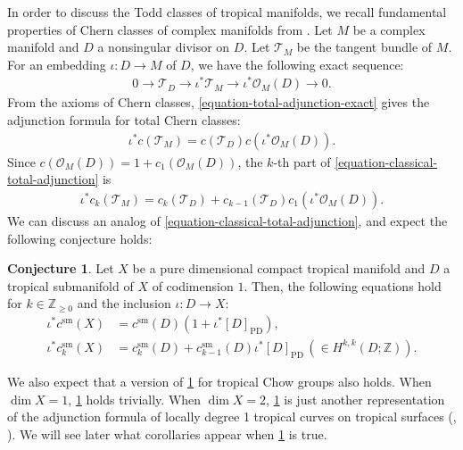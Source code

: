 \documentclass[a4paper,dvipdfmx,reqno,12pt]{amsart}
\theoremstyle{definition}
\newtheorem{conjecture}[theorem]{Conjecture}
\newcommand{\PD}[1]{[#1]_{\mathrm{PD}}}
\numberwithin{equation}{section}
\begin{document}
In order to discuss the Todd classes of
tropical manifolds, we recall fundamental properties
of Chern classes of complex manifolds from
\cite{MR1335917,MR1644323,MR2810322}.
Let $M$ be a complex manifold and 
$D$ a nonsingular
divisor on $D$. Let $\mathcal{T}_M$ be the tangent
bundle of $M$.
For an embedding $\iota\colon D\to M$ of
$D$, we have the following
exact sequence: 
\begin{align}
\label{equation-total-adjunction-exact}
0 \to \mathcal{T}_{D}\to \iota^{*}\mathcal{T}_M
\to \iota^{*}\mathcal{O}_M(D)\to 0.
\end{align}
From the axioms of Chern classes,
\eqref{equation-total-adjunction-exact} gives 
the adjunction formula for total Chern classes:
\begin{align}
\label{equation-classical-total-adjunction}
\iota^{*}c(\mathcal{T}_M)
=c(\mathcal{T}_{D})c(\iota^{*}\mathcal{O}_M(D)).
\end{align}
Since $c(\mathcal{O}_M(D))=1+c_1(\mathcal{O}_M(D))$, 
the $k$-th part of \eqref{equation-classical-total-adjunction}
is
\begin{align}
\label{equation-classical-total-adjunction-2}
\iota^{*}c_k(\mathcal{T}_M)
=c_{k}(\mathcal{T}_{D})+
c_{k-1}(\mathcal{T}_{D})c_1(\iota^{*}\mathcal{O}_M(D)).
\end{align}
We can discuss an analog of 
\eqref{equation-classical-total-adjunction},
and expect the following conjecture holds:
\begin{conjecture}
\label{conjecture-grr-divisor}
Let $X$ be a pure dimensional compact tropical manifold
and $D$ a tropical submanifold of $X$ of codimension $1$.
Then, the following equations hold for 
$k\in \mathbb{Z}_{\geq 0}$ and the inclusion 
$\iota\colon D \to X$:
\begin{align}
\label{equation-total-adjunction}
\iota^{*}c^{\mathrm{sm}}(X)&=c^{\mathrm{sm}}(D)
(1+\iota^{*}\PD{D}), \\ 
\iota^{*}c^{\mathrm{sm}}_k(X)&=c^{\mathrm{sm}}_k(D)+
c^{\mathrm{sm}}_{k-1}(D)\iota^{*}\PD{D} \,
(\in H^{k,k}(D;\mathbb{Z})).
\end{align}
\end{conjecture}
We also expect that a version
of \cref{conjecture-grr-divisor} for tropical
Chow groups \cite[Definition 3.30]{shaw2015tropical}
also holds.
When $\dim X=1$, \cref{conjecture-grr-divisor} holds
trivially. When $\dim X=2$,
\cref{conjecture-grr-divisor}
is just another representation of the adjunction formula
of locally degree 1 tropical curves on tropical surfaces
(\cite[Theorem 6]{shaw2015tropical},
\cite[Theorem 5.2]{demedrano2023chern}).
We will see later what 
corollaries appear
when \cref{conjecture-grr-divisor} is true.  
\end{document}
